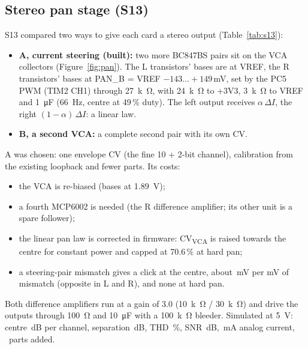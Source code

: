 \documentclass[11pt,a4paper]{article}
\newcommand{\sub}[1]{\textsubscript{#1}}
\begin{document}
\subsection{Stereo pan stage (S13)}\label{sec:pan}
S13 compared two ways to give each card a stereo output (Table~\ref{tab:s13}):
\begin{itemize}
  \item \textbf{A, current steering (built):} two more BC847BS pairs sit on the VCA collectors (Figure~\ref{fig:pan}).
    The L transistors' bases are at VREF, the R transistors' bases at PAN\_B = VREF $-143 \ldots +149$\,mV, set by
    the PC5 PWM (TIM2 CH1) through \SI{27}{k\ohm}, with \SI{24}{k\ohm} to +3V3, \SI{3}{k\ohm} to VREF and
    \SI{1}{\micro F} (\SI{66}{Hz}, centre at 49\,\% duty). The left output receives $\alpha\,\Delta I$, the right
    $(1-\alpha)\,\Delta I$: a linear law.
  \item \textbf{B, a second VCA:} a complete second pair with its own CV.
\end{itemize}
A was chosen: one envelope CV (the fine 10 + 2-bit channel), calibration from the existing loopback and fewer parts.
Its costs:
\begin{itemize}
  \item the VCA is re-biased (bases at \SI{1.89}{V});
  \item a fourth MCP6002 is needed (the R difference amplifier; its other unit is a spare follower);
  \item the linear pan law is corrected in firmware: CV\sub{VCA} is raised towards the centre for constant power and
    capped at 70.6\,\% at hard pan;
  \item a steering-pair mismatch gives a click at the centre, about \statSthirteenClick\,mV per mV of mismatch (opposite
    in L and R), and none at hard pan.
\end{itemize}
Both difference amplifiers run at a gain of 3.0 (\SI{10}{k\ohm} / \SI{30}{k\ohm}) and drive the outputs through
\SI{100}{\ohm} and \SI{10}{\micro F} with a \SI{100}{k\ohm} bleeder. Simulated at \SI{5}{V}: centre
\statSthirteenCentre\,dB per channel, separation \statSthirteenSep\,dB, THD \statSthirteenThd\,\%, SNR
\statSthirteenSnr\,dB, \statSthirteenCurrent\,mA analog current, \statSthirteenParts\ parts added.
\end{document}
